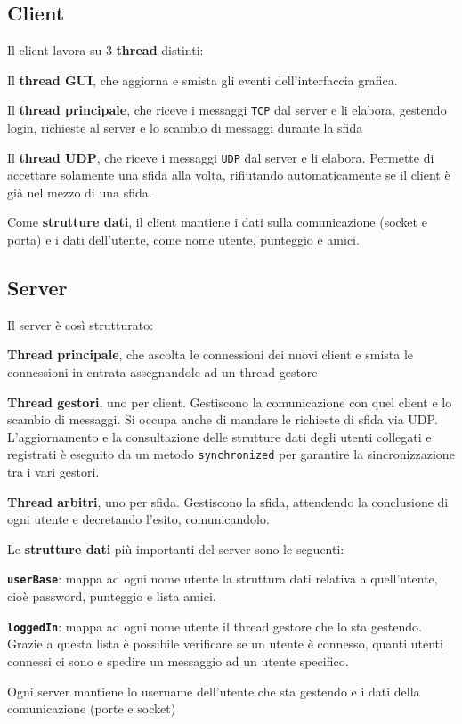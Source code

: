 \documentclass[10pt]{article}
\begin{document}
{\subsection{Client}
Il client lavora su 3 \textbf{thread} distinti:
\begin{list}{-}{}
	\item Il \textbf{thread GUI}, che aggiorna e smista gli eventi dell'interfaccia grafica.
	\item Il \textbf{thread principale}, che riceve i messaggi \texttt{TCP} dal server e li elabora, gestendo login, richieste al server e lo scambio di messaggi durante la sfida
	\item Il \textbf{thread UDP}, che riceve i messaggi \texttt{UDP} dal server e li elabora. Permette di accettare solamente una sfida alla volta, rifiutando automaticamente se il client è già nel mezzo di una sfida.
\end{list}
Come \textbf{strutture dati}, il client mantiene i dati sulla comunicazione (socket e porta) e i dati dell'utente, come nome utente, punteggio e amici.
\subsection{Server}
Il server è così strutturato:
\begin{list}{-}{}
	\item \textbf{Thread principale}, che ascolta le connessioni dei nuovi client e smista le connessioni in entrata assegnandole ad un thread gestore
	\item \textbf{Thread gestori}, uno per client. Gestiscono la comunicazione con quel client e lo scambio di messaggi. Si occupa anche di mandare le richieste di sfida via UDP.\\
	L'aggiornamento e la consultazione delle strutture dati degli utenti collegati e registrati è eseguito da un metodo \texttt{synchronized} per garantire la sincronizzazione tra i vari gestori.
	\item \textbf{Thread arbitri}, uno per sfida. Gestiscono la sfida, attendendo la conclusione di ogni utente e decretando l'esito, comunicandolo.
\end{list}
Le \textbf{strutture dati} più importanti del server sono le seguenti:
\begin{list}{-}{}
	\item \textbf{\texttt{userBase}}: mappa ad ogni nome utente la struttura dati relativa a quell'utente, cioè password, punteggio e lista amici.
	\item \textbf{\texttt{loggedIn}}: mappa ad ogni nome utente il thread gestore che lo sta gestendo. Grazie a questa lista è possibile verificare se un utente è connesso, quanti utenti connessi ci sono e spedire un messaggio ad un utente specifico.
	\item Ogni server mantiene lo username dell'utente che sta gestendo e i dati della comunicazione (porte e socket)
\end{list}
}
\end{document}
